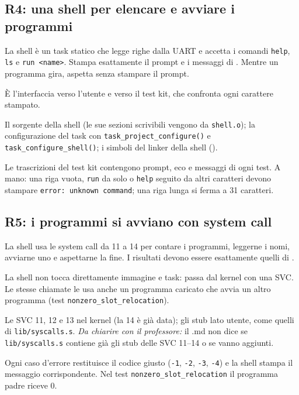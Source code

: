 \subsection{R4: una shell per elencare e avviare i programmi}
\begin{description}\sloppy
    \item[Che cosa chiede] La shell è un task statico che legge righe dalla UART e accetta i comandi \texttt{help}, \texttt{ls} e \texttt{run <name>}. Stampa esattamente il prompt e i messaggi di . Mentre un programma gira, aspetta senza stampare il prompt.
    \item[Perché serve] È l'interfaccia verso l'utente e verso il test kit, che confronta ogni carattere stampato.
    \item[Dove si interviene] Il sorgente della shell (le sue sezioni scrivibili vengono da \texttt{shell.o}); la configurazione del task con \texttt{task\_project\_configure()} e \texttt{task\_configure\_shell()}; i simboli del linker della shell ().
    \item[Come si verifica] Le trascrizioni del test kit contengono prompt, eco e messaggi di ogni test. A mano: una riga vuota, \texttt{run} da solo o \texttt{help} seguito da altri caratteri devono stampare \texttt{error:\ unknown command}; una riga lunga si ferma a 31 caratteri.
\end{description}

\subsection{R5: i programmi si avviano con system call}
\begin{description}\sloppy
    \item[Che cosa chiede] La shell usa le system call da 11 a 14 per contare i programmi, leggerne i nomi, avviarne uno e aspettarne la fine. I risultati devono essere esattamente quelli di .
    \item[Perché serve] La shell non tocca direttamente immagine e task: passa dal kernel con una SVC. Le stesse chiamate le usa anche un programma caricato che avvia un altro programma (test \texttt{nonzero\_slot\_relocation}).
    \item[Dove si interviene] Le SVC 11, 12 e 13 nel kernel (la 14 è già data); gli stub lato utente, come quelli di \texttt{lib/syscalls.s}. \emph{Da chiarire con il professore:} il .md non dice se \texttt{lib/syscalls.s} contiene già gli stub delle SVC 11--14 o se vanno aggiunti.
    \item[Come si verifica] Ogni caso d'errore restituisce il codice giusto (\texttt{-1}, \texttt{-2}, \texttt{-3}, \texttt{-4}) e la shell stampa il messaggio corrispondente. Nel test \texttt{nonzero\_slot\_relocation} il programma padre riceve 0.
\end{description}

